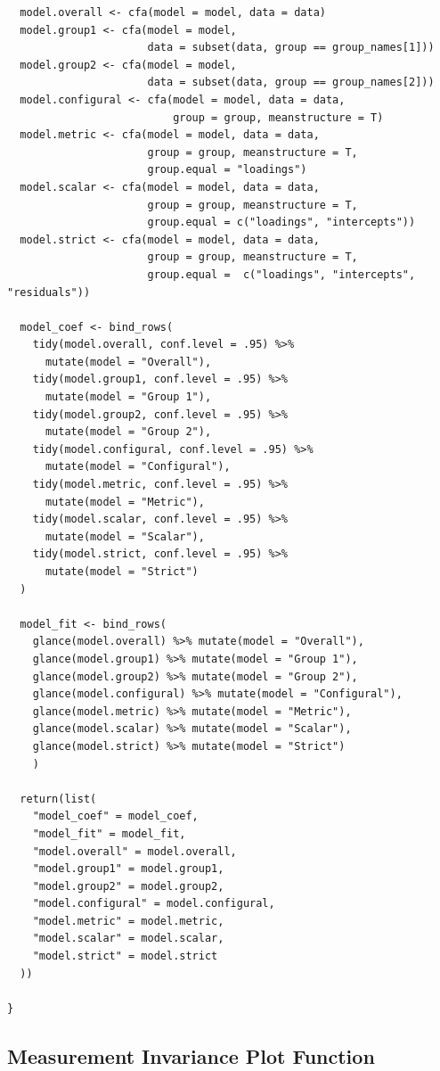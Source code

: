 \documentclass[
  man]{apa6}
\begin{document}
\begin{verbatim}
  model.overall <- cfa(model = model, data = data)
  model.group1 <- cfa(model = model, 
                      data = subset(data, group == group_names[1]))
  model.group2 <- cfa(model = model, 
                      data = subset(data, group == group_names[2]))
  model.configural <- cfa(model = model, data = data, 
                          group = group, meanstructure = T)
  model.metric <- cfa(model = model, data = data, 
                      group = group, meanstructure = T,
                      group.equal = "loadings")
  model.scalar <- cfa(model = model, data = data, 
                      group = group, meanstructure = T, 
                      group.equal = c("loadings", "intercepts"))
  model.strict <- cfa(model = model, data = data, 
                      group = group, meanstructure = T, 
                      group.equal =  c("loadings", "intercepts", "residuals"))
  
  model_coef <- bind_rows(
    tidy(model.overall, conf.level = .95) %>% 
      mutate(model = "Overall"), 
    tidy(model.group1, conf.level = .95) %>% 
      mutate(model = "Group 1"), 
    tidy(model.group2, conf.level = .95) %>% 
      mutate(model = "Group 2"), 
    tidy(model.configural, conf.level = .95) %>% 
      mutate(model = "Configural"), 
    tidy(model.metric, conf.level = .95) %>% 
      mutate(model = "Metric"), 
    tidy(model.scalar, conf.level = .95) %>% 
      mutate(model = "Scalar"), 
    tidy(model.strict, conf.level = .95) %>% 
      mutate(model = "Strict")
  )
    
  model_fit <- bind_rows(
    glance(model.overall) %>% mutate(model = "Overall"), 
    glance(model.group1) %>% mutate(model = "Group 1"), 
    glance(model.group2) %>% mutate(model = "Group 2"), 
    glance(model.configural) %>% mutate(model = "Configural"), 
    glance(model.metric) %>% mutate(model = "Metric"), 
    glance(model.scalar) %>% mutate(model = "Scalar"), 
    glance(model.strict) %>% mutate(model = "Strict")
    )
  
  return(list(
    "model_coef" = model_coef,
    "model_fit" = model_fit,
    "model.overall" = model.overall,
    "model.group1" = model.group1,
    "model.group2" = model.group2,
    "model.configural" = model.configural,
    "model.metric" = model.metric,
    "model.scalar" = model.scalar,
    "model.strict" = model.strict
  ))
  
}
\end{verbatim}

\normalsize

\hypertarget{measurement-invariance-plot-function}{%
\subsection{Measurement Invariance Plot Function}\label{measurement-invariance-plot-function}}
\end{document}
